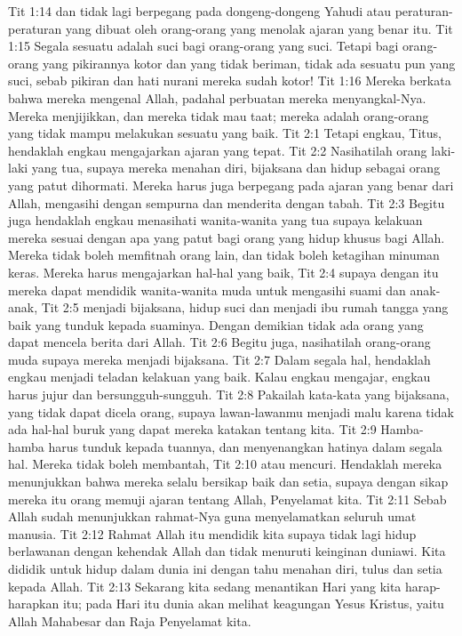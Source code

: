 Tit 1:14  dan tidak lagi berpegang pada dongeng-dongeng Yahudi atau peraturan-peraturan yang dibuat oleh orang-orang yang menolak ajaran yang benar itu.
Tit 1:15  Segala sesuatu adalah suci bagi orang-orang yang suci. Tetapi bagi orang-orang yang pikirannya kotor dan yang tidak beriman, tidak ada sesuatu pun yang suci, sebab pikiran dan hati nurani mereka sudah kotor!
Tit 1:16  Mereka berkata bahwa mereka mengenal Allah, padahal perbuatan mereka menyangkal-Nya. Mereka menjijikkan, dan mereka tidak mau taat; mereka adalah orang-orang yang tidak mampu melakukan sesuatu yang baik.
Tit 2:1  Tetapi engkau, Titus, hendaklah engkau mengajarkan ajaran yang tepat.
Tit 2:2  Nasihatilah orang laki-laki yang tua, supaya mereka menahan diri, bijaksana dan hidup sebagai orang yang patut dihormati. Mereka harus juga berpegang pada ajaran yang benar dari Allah, mengasihi dengan sempurna dan menderita dengan tabah.
Tit 2:3  Begitu juga hendaklah engkau menasihati wanita-wanita yang tua supaya kelakuan mereka sesuai dengan apa yang patut bagi orang yang hidup khusus bagi Allah. Mereka tidak boleh memfitnah orang lain, dan tidak boleh ketagihan minuman keras. Mereka harus mengajarkan hal-hal yang baik,
Tit 2:4  supaya dengan itu mereka dapat mendidik wanita-wanita muda untuk mengasihi suami dan anak-anak,
Tit 2:5  menjadi bijaksana, hidup suci dan menjadi ibu rumah tangga yang baik yang tunduk kepada suaminya. Dengan demikian tidak ada orang yang dapat mencela berita dari Allah.
Tit 2:6  Begitu juga, nasihatilah orang-orang muda supaya mereka menjadi bijaksana.
Tit 2:7  Dalam segala hal, hendaklah engkau menjadi teladan kelakuan yang baik. Kalau engkau mengajar, engkau harus jujur dan bersungguh-sungguh.
Tit 2:8  Pakailah kata-kata yang bijaksana, yang tidak dapat dicela orang, supaya lawan-lawanmu menjadi malu karena tidak ada hal-hal buruk yang dapat mereka katakan tentang kita.
Tit 2:9  Hamba-hamba harus tunduk kepada tuannya, dan menyenangkan hatinya dalam segala hal. Mereka tidak boleh membantah,
Tit 2:10  atau mencuri. Hendaklah mereka menunjukkan bahwa mereka selalu bersikap baik dan setia, supaya dengan sikap mereka itu orang memuji ajaran tentang Allah, Penyelamat kita.
Tit 2:11  Sebab Allah sudah menunjukkan rahmat-Nya guna menyelamatkan seluruh umat manusia.
Tit 2:12  Rahmat Allah itu mendidik kita supaya tidak lagi hidup berlawanan dengan kehendak Allah dan tidak menuruti keinginan duniawi. Kita dididik untuk hidup dalam dunia ini dengan tahu menahan diri, tulus dan setia kepada Allah.
Tit 2:13  Sekarang kita sedang menantikan Hari yang kita harap-harapkan itu; pada Hari itu dunia akan melihat keagungan Yesus Kristus, yaitu Allah Mahabesar dan Raja Penyelamat kita.
